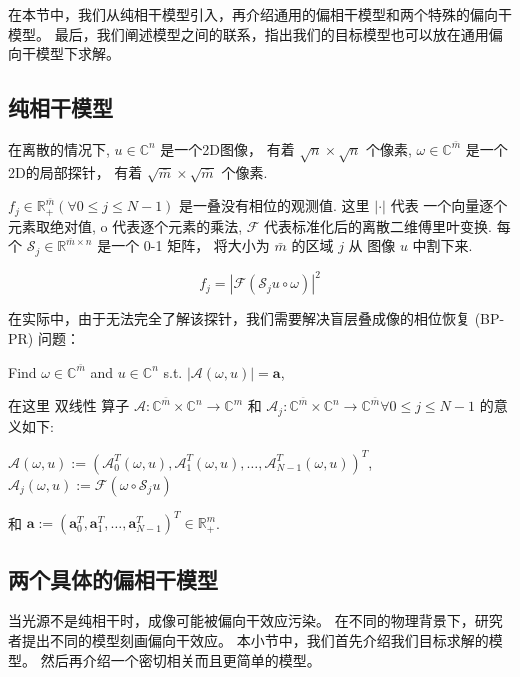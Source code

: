 \documentclass[12pt]{article}
\begin{document}
在本节中，我们从纯相干模型引入，再介绍通用的偏相干模型和两个特殊的偏向干模型。 最后，我们阐述模型之间的联系，指出我们的目标模型也可以放在通用偏向干模型下求解。

\subsection{纯相干模型}


在离散的情况下, $u \in \mathbb{C}^{n}$ 是一个2D图像， 有着 $\sqrt{n} \times \sqrt{n}$ 个像素, $\omega \in \mathbb{C}^{\bar{m}}$ 是一个2D的局部探针， 有着 $\sqrt{\bar{m}} \times \sqrt{\bar{m}}$ 个像素.

$f_{j} \in \mathbb{R}_{+}^{\bar{m}}(\forall 0 \leq j \leq N-1)$ 是一叠没有相位的观测值. 这里 $|\cdot|$ 代表 一个向量逐个元素取绝对值, o 代表逐个元素的乘法,  $\mathcal{F}$ 代表标准化后的离散二维傅里叶变换. 每个 $\mathcal{S}_{j} \in \mathbb{R}^{\bar{m} \times n}$ 是一个 0-1 矩阵， 将大小为 $\bar{m}$ 的区域 $j$ 从 图像 $u$ 中割下来.

\begin{equation}
\label{basic}
f_{j}=\left|\mathcal{F}\left( \mathcal{S}_{j} u  \circ \omega \right)\right|^{2} 
\end{equation}

在实际中，由于无法完全了解该探针，我们需要解决盲层叠成像的相位恢复 (BP-PR) 问题：

Find $\omega \in \mathbb{C}^{\bar{m}}$ and $u \in \mathbb{C}^{n}$ s.t. $|\mathcal{A}(\omega, u)|=\boldsymbol{a}$,

在这里 双线性 算子 $\mathcal{A}: \mathbb{C}^{\bar{m}} \times \mathbb{C}^{n} \rightarrow \mathbb{C}^{m}$ 和 $\mathcal{A}_{j}: \mathbb{C}^{\bar{m}} \times \mathbb{C}^{n} \rightarrow \mathbb{C}^{\bar{m}} \forall 0 \leq j \leq N-1$ 的意义如下:

$\mathcal{A}(\omega, u):=\left(\mathcal{A}_{0}^{T}(\omega, u), \mathcal{A}_{1}^{T}(\omega, u), \ldots, \mathcal{A}_{N-1}^{T}(\omega, u)\right)^{T}$, $\mathcal{A}_{j}(\omega, u):=\mathcal{F}\left(\omega \circ \mathcal{S}_{j} u\right)$

和 $\boldsymbol{a}:=\left(\boldsymbol{a}_{0}^{T}, \boldsymbol{a}_{1}^{T}, \ldots, \boldsymbol{a}_{N-1}^{T}\right)^{T} \in \mathbb{R}_{+}^{m}$.

\subsection{两个具体的偏相干模型}
\label{section:specific models}
当光源不是纯相干时，成像可能被偏向干效应污染。 在不同的物理背景下，研究者提出不同的模型刻画偏向干效应。 本小节中，我们首先介绍我们目标求解的模型。 然后再介绍一个密切相关而且更简单的模型。
\end{document}
